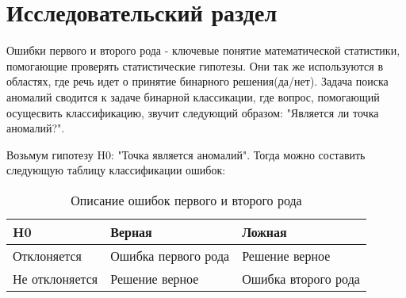 \chapter{Исследовательский раздел}
Ошибки первого и второго рода - ключевые понятие математической статистики, помогающие проверять статистические гипотезы. Они так же используются в областях, где речь идет о принятие бинарного решения(да/нет). Задача поиска аномалий сводится к задаче бинарной классикации, где вопрос, помогающий осущесвить классификацию, звучит следующий образом: "Является ли точка аномалий?". 

Возьмум гипотезу H0: "Точка является аномалий". Тогда можно составить следующую таблицу классификации ошибок:
\begin{table}[!h]
	
	\caption{\label{tab:truefalse}Описание ошибок первого и второго рода}
	
	\begin{center}
		
		\begin{tabular}{|l|l|l|}
			
			\hline
			
			H0 & Верная & Ложная \\
			
			\hline \hline
			
			 Отклоняется & Ошибка первого рода & Решение верное \\
			
			\hline 
	       Не отклоняется & Решение верное  & Ошибка второго рода\\
						\hline 
			
		\end{tabular}
		
	\end{center}
	
\end{table}

